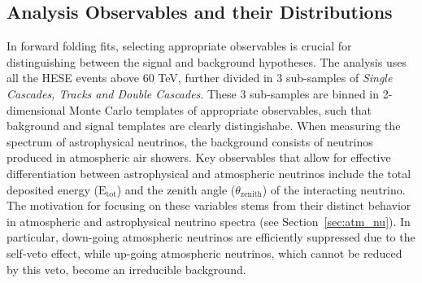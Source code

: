 \subsection{Analysis Observables and their Distributions}
\label{sec:hists}

In forward folding fits, selecting appropriate observables is crucial for distinguishing between the signal and background hypotheses. The analysis uses all the HESE events above 60 TeV, further divided in 3 sub-samples of \emph{Single Cascades, Tracks and Double Cascades}. These 3 sub-samples are binned in 2-dimensional Monte Carlo templates of appropriate observables, such that bakground and signal templates are clearly distingishabe. When measuring the spectrum of astrophysical neutrinos, the background consists of neutrinos produced in atmospheric air showers. Key observables that allow for effective differentiation between astrophysical and atmospheric neutrinos include the total deposited energy ($\mathrm{E}_\mathrm{tot}$) and the zenith angle ($\theta_{\mathrm{zenith}}$) of the interacting neutrino. The motivation for focusing on these variables stems from their distinct behavior in atmospheric and astrophysical neutrino spectra (see Section~\ref{sec:atm_nu}). In particular, down-going atmospheric neutrinos are efficiently suppressed due to the self-veto effect, while up-going atmospheric neutrinos, which cannot be reduced by this veto, become an irreducible background. 

